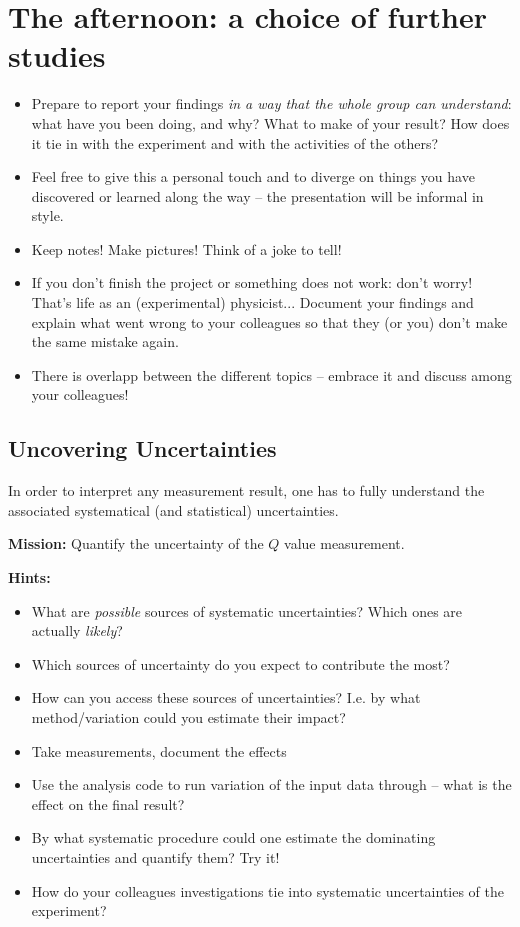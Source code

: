 \documentclass[a4,11pt, notitlepage]{article}
\begin{document}
\section{The afternoon: a choice of further studies}
\label{sec:afternoon}

\begin{itemize}
\item Prepare to report your findings \emph{in a way that the
    whole group can understand}: what have you been doing, and why?
  What to make of your result? How does it tie in with the experiment
  and with the activities of the others?
\item Feel free to give this a personal touch and to diverge on things
  you have discovered or learned along the way -- the presentation
  will be informal in style.
\item Keep notes! Make pictures! Think of a joke to tell!
\item If you don't finish the project or something does not work:
  don't worry! That's life as an (experimental) physicist... Document
  your findings and explain what went wrong to your colleagues so that
  they (or you) don't make the same mistake again.
\item There is overlapp between the different topics -- embrace it and
  discuss among your colleagues!
\end{itemize}

\subsection{Uncovering Uncertainties}
\label{sec:uncertainties}

In order to interpret any measurement result, one has to fully
understand the associated systematical (and statistical)
uncertainties.

\textbf{Mission:} Quantify the uncertainty of the $Q$ value measurement.

\textbf{Hints:}
\begin{itemize}
\item What are \emph{possible} sources of systematic uncertainties?
  Which ones are actually \emph{likely}?
\item Which sources of uncertainty do you expect to contribute the most?
\item How can you access these sources of uncertainties? I.e. by what
  method/variation could you estimate their impact?
\item Take measurements, document the effects
\item Use the analysis code to run variation of the input data through
  -- what is the effect on the final result?
\item By what systematic procedure could one estimate the dominating
  uncertainties and quantify them? Try it!
\item How do your colleagues investigations tie into systematic
  uncertainties of the experiment?
\end{itemize}
\end{document}
